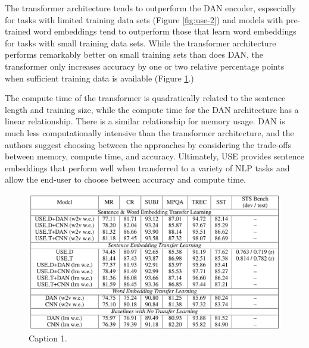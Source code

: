 The transformer architecture tends to outperform the DAN encoder, espsecially for tasks with limited training data sets (Figure \ref{fig:use-2}) and models with pre-trained word embeddings tend to outperform those that learn word embeddings for tasks with small training data sets. While the transformer architecture performs remarkably better on small training sets than does DAN, the transformer only increases accuracy by one or two relative percentage points when sufficient training data is available (Figure \ref{fig:use-1}.) 

The compute time of the transformer is quadratically related to the sentence length and training size, while the compute time for the DAN architecture has a linear relationship. There is a similar relationship for memory usage. DAN is much less computationally intensive than the transformer architecture, and the authors suggest choosing between the approaches by considering the trade-offs between memory, compute time, and accuracy. Ultimately, USE provides sentence embeddings that perform well when transferred to a variety of NLP tasks and allow the end-user to choose between accuracy and compute time.

\newpage



\begin{figure}[h!]
\centering
  \includegraphics[width=1\linewidth]{files/use-2.png}
  \caption{Caption 1.}
  \label{fig:use-1}
\end{figure}

